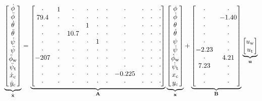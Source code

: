 \begin{equation*}
\underbrace{
\begin{bmatrix}   \dot\phi \\ \ddot\phi \\ \dot\theta \\ \ddot\theta \\ \dot\psi \\ \ddot\psi \\ \ddot\phi_{\text{w}} \\ \ddot\psi_{\text{t}} \\ \dot x_{\text{c}} \\  \dot y_{\text{c}}   \end{bmatrix} 
}_{\dot{\mathbf{x}} }
= 
\underbrace{
\begin{bmatrix} 
\cdot  &  1 & \cdot & \cdot & \cdot  &  \cdot & \cdot & \cdot & \cdot & \cdot \\
79.4  &  \cdot & \cdot & \cdot & \cdot &  \cdot & \cdot & \cdot & \cdot & \cdot \\
\cdot  &  \cdot & \cdot & 1 & \cdot  & \cdot & \cdot & \cdot & \cdot & \cdot \\
\cdot  &  \cdot & 10.7 & \cdot & \cdot  & \cdot & \cdot & \cdot & \cdot & \cdot \\
\cdot  &  \cdot & \cdot & \cdot & 1  & \cdot & \cdot & \cdot & \cdot & \cdot \\
\cdot  &  \cdot & \cdot & \cdot & \cdot  & \cdot & \cdot & \cdot & \cdot & \cdot \\
-207  &  \cdot & \cdot & \cdot & \cdot  & \cdot & \cdot & \cdot & \cdot & \cdot \\
\cdot  &  \cdot & \cdot & \cdot & \cdot  & \cdot & \cdot & \cdot & \cdot & \cdot \\
\cdot  &  \cdot & \cdot & \cdot & \cdot  & \cdot & -0.225 & \cdot & \cdot & \cdot \\
\cdot  &  \cdot & \cdot & \cdot & \cdot  & \cdot & \cdot & \cdot & \cdot & \cdot 
 \end{bmatrix}
}_{\mathbf{A}}
\underbrace{
\begin{bmatrix}   \phi \\ \dot\phi \\ \theta \\ \dot\theta \\ \psi \\ \dot\psi \\ \dot\phi_{\text{w}} \\ \dot\psi_{\text{t}} \\ x_{\text{c}} \\  y_{\text{c}}   \end{bmatrix} 
}_{\mathbf{x}}
+ 
\underbrace{
\begin{bmatrix} 
\cdot & \cdot \\
\cdot & -1.40 \\
\cdot & \cdot \\
\cdot  &  \cdot \\
\cdot  &  \cdot \\
-2.23 &  \cdot \\
\cdot & 4.21 \\
7.23 & \cdot \\
\cdot  & \cdot \\
\cdot  & \cdot
 \end{bmatrix}
}_{\mathbf{B}}
\underbrace{
\begin{bmatrix} u_{\text{w}} \\ u_{\text{t}} \end{bmatrix}
}_{\mathbf{u}}
\end{equation*}
